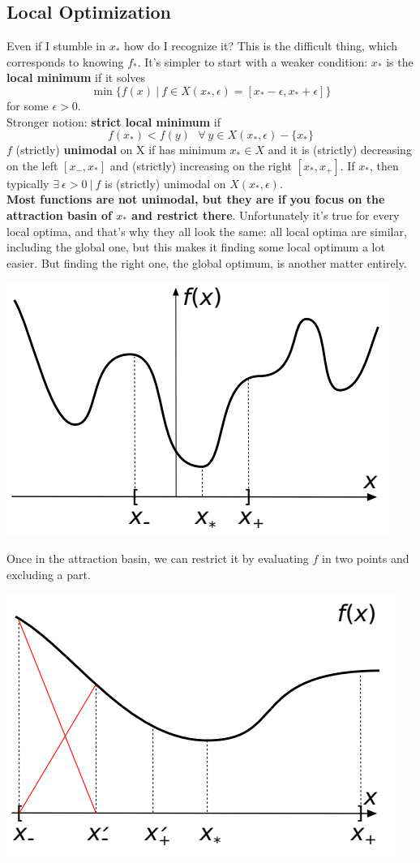\documentclass[10pt]{report}
\begin{document}
\subsection{Local Optimization} Even if I stumble in $x_*$ how do I recognize it? This is the difficult thing, which corresponds to knowing $f_*$. It's simpler to start with a weaker condition: $x_*$ is the \textbf{local minimum} if it solves $$\min\{f(x)\:|\:f\in X(x_*, \epsilon) = [x_* - \epsilon, x_* + \epsilon]\}$$ for some $\epsilon > 0$.\\
Stronger notion: \textbf{strict local minimum} if $$f(x_*) < f(y)\:\:\:\forall\:y\in X(x_*,\epsilon) - \{x_*\}$$
$f$ (strictly) \textbf{unimodal} on X if has minimum $x_* \in X$ and it is (strictly) decreasing on the left $[x_-, x_*]$ and (strictly) increasing on the right $[x_*, x_+]$. If $x_*$, then typically $\exists\:\epsilon>0\:|\:f$ is (strictly) unimodal on $X(x_*,\epsilon)$.\\
\textbf{Most functions are not unimodal, but they are if you focus on the attraction basin of $x_*$ and restrict there}. Unfortunately it's true for every local optima, and that's why they all look the same: all local optima are similar, including the global one, but this makes it finding some local optimum a lot easier. But finding the right one, the global optimum, is another matter entirely.
\begin{center}
	\includegraphics[scale=0.5]{5.png}
\end{center}
Once in the attraction basin, we can restrict it by evaluating $f$ in two points and excluding a part.
\begin{center}
	\includegraphics[scale=0.5]{6.png}
\end{center}
\end{document}
